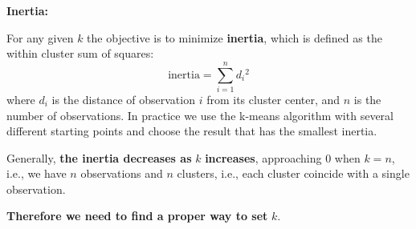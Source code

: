 \textbf{Inertia:}

For any given $k$ the objective is to minimize \textbf{inertia}, which is defined as the within cluster sum of squares:
\begin{equation*}
    \text{inertia} =\sum _{i=1}^{n} d{_{i}}^{2}
\end{equation*}
where $d_{i}$ is the distance of observation $i$ from its cluster center, and $n$ is the number of observations. In practice we use the k-means algorithm with several different starting points and choose the result that has the smallest inertia.

Generally, \textbf{the inertia decreases as }$k$\textbf{ increases}, approaching $0$ when $k=n$, i.e., we have $n$ observations and $n$ clusters, i.e., each cluster coincide with a single observation.

\textbf{Therefore we need to find a proper way to set }$k$.

